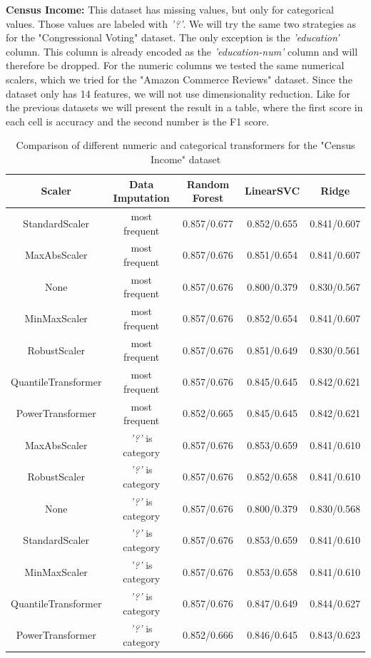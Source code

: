 \documentclass[a4paper,10pt]{article}
\begin{document}
\textbf{Census Income:} This dataset has missing values, but only for categorical values.
 Those values are labeled with \textit{'?'}. We will try the same two strategies as for the "Congressional Voting" dataset.
 The only exception is the \textit{'education'} column. This column is already encoded as the
 \textit{'education-num'} column and will therefore be dropped. For the numeric columns 
 we tested the same numerical scalers, which we tried for the 
 "Amazon Commerce Reviews" dataset. Since the dataset only has 14 features,
we will not use dimensionality reduction. Like for the previous
datasets we will present the result in a table, where the first score in each cell is accuracy and the second
number is the F1 score.

\begin{table}[h!]
\centering
\small
\begin{tabular}{|c|c|c|c|c|}
\hline
\textbf{Scaler} & \textsf{Data Imputation} & \textbf{Random Forest} & \textbf{LinearSVC} & \textbf{Ridge} \\
\hline
StandardScaler & most frequent & \cellcolor[HTML]{C1E1C1}0.857/0.677 & 0.852/0.655 & 0.841/0.607 \\
\hline
MaxAbsScaler & most frequent & 0.857/0.676 & 0.851/0.654 & 0.841/0.607 \\
\hline
None & most frequent & 0.857/0.676 & 0.800/0.379 & 0.830/0.567 \\
\hline
MinMaxScaler & most frequent & 0.857/0.676 & 0.852/0.654 & 0.841/0.607 \\
\hline
RobustScaler & most frequent & 0.857/0.676 & 0.851/0.649 & 0.830/0.561 \\
\hline
QuantileTransformer & most frequent & 0.857/0.676 & 0.845/0.645 & 0.842/0.621 \\
\hline
PowerTransformer & most frequent & 0.852/0.665 & 0.845/0.645 & 0.842/0.621 \\
\hline
MaxAbsScaler & \textit{'?'} is category & 0.857/0.676 & 0.853/0.659 & 0.841/0.610 \\
\hline
RobustScaler & \textit{'?'} is category & 0.857/0.676 & 0.852/0.658 & 0.841/0.610 \\
\hline
None & \textit{'?'} is category & 0.857/0.676 & 0.800/0.379 & 0.830/0.568 \\
\hline
StandardScaler & \textit{'?'} is category & 0.857/0.676 & \cellcolor[HTML]{C1E1C1}0.853/0.659 & 0.841/0.610 \\
\hline
MinMaxScaler & \textit{'?'} is category & 0.857/0.676 & 0.853/0.658 & 0.841/0.610 \\
\hline
QuantileTransformer & \textit{'?'} is category & 0.857/0.676 & 0.847/0.649 & \cellcolor[HTML]{C1E1C1}0.844/0.627 \\
\hline
PowerTransformer & \textit{'?'} is category & 0.852/0.666 & 0.846/0.645 & 0.843/0.623 \\
\hline
\end{tabular}
\caption{Comparison of different numeric and categorical transformers for the "Census Income" dataset}
\label{table:censustransformers}
\end{table}
\end{document}
